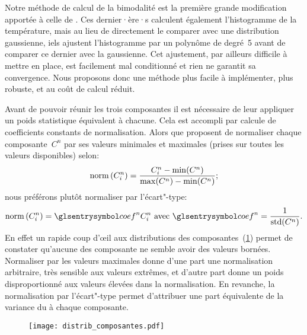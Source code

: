 Notre méthode de calcul de la bimodalité est la première grande modification apportée à celle de \textcite{liu_2016}.
Ces dernier·ère·s calculent également l'histogramme de la température, mais au lieu de directement le comparer avec une distribution gaussienne, iels ajustent l'histogramme par un polynôme de degré~5 avant de comparer ce dernier avec la gaussienne.
Cet ajustement, par ailleurs difficile à mettre en place, est facilement mal conditionné et rien ne garantit sa convergence.
Nous proposons donc une méthode plus facile à implémenter, plus robuste, et au coût de calcul réduit.

Avant de pouvoir réunir les trois composantes il est nécessaire de leur appliquer un poids statistique équivalent à chacune. Cela est accompli par calcule de coefficients constants de normalisation.
Alors que \citeauthor{liu_2016} proposent de normaliser chaque composante~\(C^n\) par ses valeurs minimales et maximales (prises sur toutes les valeurs disponibles) selon:
\begin{equation}
  \operatorname{norm}\left(C_i^n\right) = \frac {C_i^n - \min(C^n)} {\max(C^n) - \min(C^n)} ;
\end{equation}
nous préférons plutôt normaliser par l'écart"-type:
\begin{equation}
  \norm{C_i^n} = \am{coef}^n C_i^n
  \text{ avec } \am{coef}^n = \frac {1} {\std(C^n)} .
\end{equation}
En effet un rapide coup d’œil aux distributions des composantes~(\cref{fig:distrib-composantes}) permet de constater qu'aucune des composante ne semble avoir des valeurs bornées.
Normaliser par les valeurs maximales donne d'une part une normalisation arbitraire, très sensible aux valeurs extrêmes, et d'autre part donne un poids disproportionné aux valeurs élevées dans la normalisation.
En revanche, la normalisation par l'écart"-type permet d'attribuer une part équivalente de la variance du  à chaque composante.

\begin{figure}
  \centering
  \texttt{[image: distrib\_composantes.pdf]}
  \label{fig:distrib-composantes}
\end{figure}


